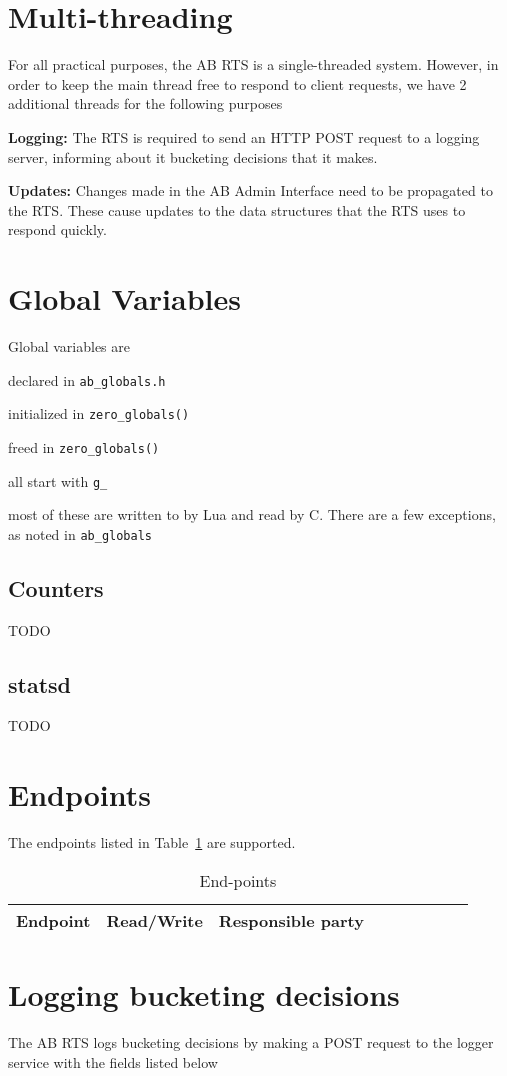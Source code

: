 \documentclass[letterpaper]{article}
\begin{document}
\section{Multi-threading}

For all practical purposes, the AB RTS is a single-threaded system.
However, in order to keep the main thread free to respond to client requests, we
have 2 additional threads for the following purposes
\be
\item {\bf Logging:} The RTS is required to send an HTTP POST request to a
  logging server, informing about it bucketing decisions that it makes. 
\item {\bf Updates:} Changes made in the AB Admin Interface need to be
  propagated to the RTS. These cause updates to the data structures that the RTS
  uses to respond quickly.
  \ee

\section{Global Variables}

Global variables are 
\bi
\item declared in \verb+ab_globals.h+
\item initialized in \verb+zero_globals()+
\item freed in \verb+zero_globals()+
\item all start with \verb+g_+
\item most of these are written to by Lua and read by C. There are a few
  exceptions, as noted in \verb+ab_globals+
\ei

\subsection{Counters}

TODO \TBC 

\subsection{statsd}

TODO \TBC 

\section{Endpoints}
The endpoints listed in Table~\ref{tbl_endpoints} are supported.
\begin{table}[hb]
\centering
\begin{tabular}{|l||l|l|l|l|l|l|l|l|}  \hline \hline
  {\bf Endpoint } & {\bf Read/Write} & {\bf Responsible party} \\ \hline \hline

\hline
\end{tabular}
\caption{End-points}
\label{tbl_endpoints}
\end{table}

\section{Logging bucketing decisions}

The AB RTS logs bucketing decisions by making a POST request to the logger
service with the fields listed below


\TBC
\end{document}
